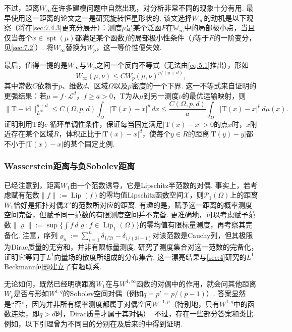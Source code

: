 不过，距离$W_\infty$在许多建模问题中自然出现，对分析非常不同的现象十分有用. 最早使用这一距离的论文之一是研究旋转恒星形状的\cite{b232}. 该文选择$W_\infty$的动机是以下观察（将在\autoref{sec:7.4.3}更充分展开）：测度$\mu$是某个泛函$F$在$\mathbb W_\infty$中的局部极小点，当且仅当每个$x\in\operatorname{spt}(\mu)$都满足某个函数$f$的局部极小性条件（$f$等于$F$的一阶变分，见\autoref{sec:7.2}）. 将$W_\infty$替换为$W_p$，这一等价性便失效.

最后，值得一提的是$W_\infty$与$W_p$之间一个反向不等式（无法由\eqref{eq:5.1}推出），形如
\[
W_\infty(\mu,\nu)\le C W_p(\mu,\nu)^{p/(p+d)},
\]
其中常数$C$依赖于$p$、维数$d$、区域$\Omega$以及$\mu$密度的一个下界. 这一不等式来自\cite{b74}证明的更强结果：若$\mu=f\cdot\mathscr L^d$，$f\ge a>0$，$\mathrm T$为从$\mu$到另一测度$\nu$的最优运输映射，则
\[
\|\mathrm T-\mathrm{id}\|_{L^\infty}^{p+d}
\le C(\Omega,p,d)\int_\Omega|\mathrm T(x)-x|^p\,dx
\le\frac{C(\Omega,p,d)}a\int_\Omega|\mathrm T(x)-x|^p\,d\mu(x).
\]
证明利用$\mathrm T$的$c$-循环单调性条件，保证每当固定满足$|\mathrm T(x)-x|>0$的点$x$时，$x$附近存在某个区域$R$，体积正比于$|\mathrm T(x)-x|^d$，使每个$y\in R$的距离$|\mathrm T(y)-y|$都不小于$|\mathrm T(x)-x|$的某个固定比例.

\subsubsection{Wasserstein距离与负Sobolev距离}\label{sec:5.5.2}

已经注意到，距离$W_1$由一个范数诱导，它是Lipschitz半范数的对偶. 事实上，若考虑赋有范数$\|f\|:=\operatorname{Lip}(f)$的零均值Lipschitz函数空间$\mathscr X$，则$\mathscr P_1(\Omega)$上的距离$W_1$恰好是拓扑对偶$\mathscr X'$的范数所对应的距离. 有趣的是，赋予这一距离的概率测度空间完备，但赋予同一范数的有限测度空间并不完备. 更准确地，可以考虑赋予范数$\|\varrho\|:=\sup\{\int f\,d\varrho:f\in\operatorname{Lip}_1(\Omega)\}$的零均值有限标量测度，再考察其完备化. 注意，序列$\varrho_n:=\sum_{i=1}^n\delta_{1/2i}-\delta_{1/(2i-1)}$对该范数是Cauchy列，但其极限为Dirac质量的无穷和，并非有限标量测度. \cite{b73}研究了测度集合对这一范数的完备化，证明它等同于$L^1$向量场的散度所组成的分布集合. 这一漂亮结果与\autoref{sec:4}研究的$L^1$-Beckmann问题建立了有趣联系.

无论如何，既然已经明确距离$W_1$在与$W^{1,\infty}$函数的对偶中的作用，就会问其他距离$W_p$是否与形如$W^{1,q}$的Sobolev空间对偶（例如$q=p'=p/(p-1)$）. 答案显然是“否”，因为并非所有概率测度都属于对偶空间$W^{-1,p}$（特别地，只有$W^{1,q}$中的函数连续，即$q>d$时，Dirac质量才属于其对偶）. 不过，存在一些部分答案和类比. 例如，以下引理曾为不同目的分别在\cite{b214}及后来的\cite{b225}中得到证明.

